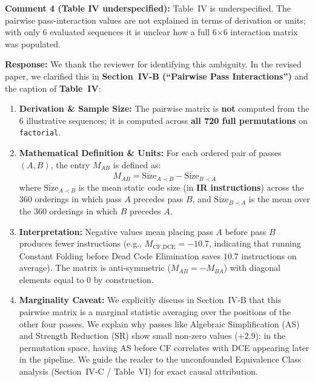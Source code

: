 \documentclass[10pt,a4paper]{article}
\begin{document}
\vspace{0.8em}
\begin{reviewercomment}
\textbf{Comment 4 (Table IV underspecified):} Table~IV is underspecified. The pairwise pass-interaction values are not explained in terms of derivation or units; with only 6 evaluated sequences it is unclear how a full 6$\times$6 interaction matrix was populated.
\end{reviewercomment}

\noindent \textbf{Response:} We thank the reviewer for identifying this ambiguity. In the revised paper, we clarified this in \textbf{Section~IV-B (``Pairwise Pass Interactions'')} and the caption of \textbf{Table~IV}:
\begin{enumerate}[itemsep=1pt,parsep=0pt,topsep=2pt]
    \item \textbf{Derivation \& Sample Size:} The pairwise matrix is \textbf{not} computed from the 6 illustrative sequences; it is computed across \textbf{all 720 full permutations} on \texttt{factorial}.
    \item \textbf{Mathematical Definition \& Units:} For each ordered pair of passes $(A, B)$, the entry $M_{AB}$ is defined as:
    \[ M_{AB} = \overline{\text{Size}}_{A \prec B} - \overline{\text{Size}}_{B \prec A} \]
    where $\overline{\text{Size}}_{A \prec B}$ is the mean static code size (in \textbf{IR instructions}) across the 360 orderings in which pass $A$ precedes pass $B$, and $\overline{\text{Size}}_{B \prec A}$ is the mean over the 360 orderings in which $B$ precedes $A$.
    \item \textbf{Interpretation:} Negative values mean placing pass $A$ before pass $B$ produces fewer instructions (e.g., $M_{\text{CF}, \text{DCE}} = -10.7$, indicating that running Constant Folding before Dead Code Elimination saves $10.7$ instructions on average). The matrix is anti-symmetric ($M_{AB} = -M_{BA}$) with diagonal elements equal to 0 by construction.
    \item \textbf{Marginality Caveat:} We explicitly discuss in Section~IV-B that this pairwise matrix is a marginal statistic averaging over the positions of the other four passes. We explain why passes like Algebraic Simplification (AS) and Strength Reduction (SR) show small non-zero values ($+2.9$): in the permutation space, having AS before CF correlates with DCE appearing later in the pipeline. We guide the reader to the unconfounded Equivalence Class analysis (Section~IV-C / Table~VI) for exact causal attribution.
\end{enumerate}
\end{document}

